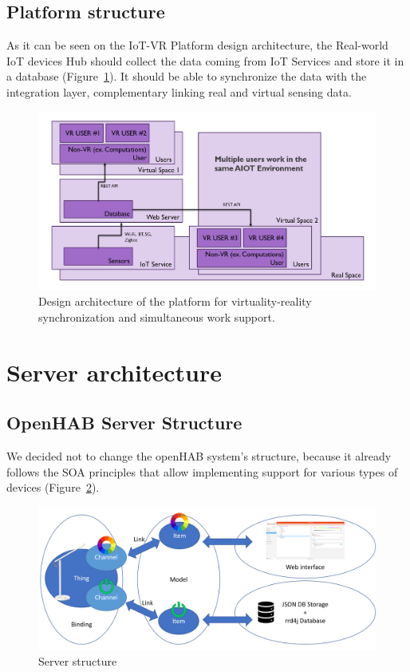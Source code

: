 \subsection{Platform structure}

As it can be seen on the IoT-VR Platform design architecture, the Real-world IoT devices Hub should collect the data coming from IoT Services and store it in a database (Figure~\ref{fig:StructureVersion2-figure}). It should be able to synchronize the data with the integration layer, complementary linking real and virtual sensing data.

\begin{figure}
  \centering
  \includegraphics[width=0.9\linewidth]{figures/StructureVersion2.png}
  \caption{Design architecture of the platform for virtuality-reality synchronization and simultaneous work support.}
  \label{fig:StructureVersion2-figure}
\end{figure}

\section{Server architecture}

\subsection{OpenHAB Server Structure}

We decided not to change the openHAB system's structure, because it already follows the SOA principles that allow implementing support for various types of devices (Figure~\ref{fig:openHABServerStructure-figure}).

\begin{figure}
  \centering
  \includegraphics[width=0.9\linewidth]{figures/openHABServerStructure.png}
  \caption{Server structure}
  \label{fig:openHABServerStructure-figure}
\end{figure}

